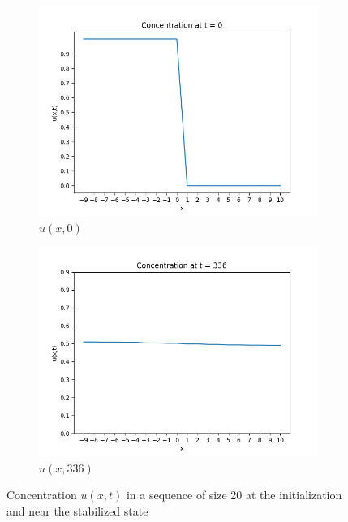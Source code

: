 \begin{figure}[ht]
    \centering
    \begin{subfigure}[b]{0.49\textwidth}
        \centering
        \includegraphics[width=\textwidth]{figures/concentration_at_t_0_size_20.png}
        \caption{$u(x,0)$}
        \label{fig:u_0}
    \end{subfigure}
    \hfill
    \begin{subfigure}[b]{0.49\textwidth}
        \centering
        \includegraphics[width=\textwidth]{figures/concentration_at_t_336_size_20.png}
        \caption{$u(x,336)$}
        \label{fig:u_336}
    \end{subfigure}
    \caption{Concentration $u(x,t)$ in a sequence of size 20 at the initialization and near
    the stabilized state}
    \label{fig:seq_20}
\end{figure}

